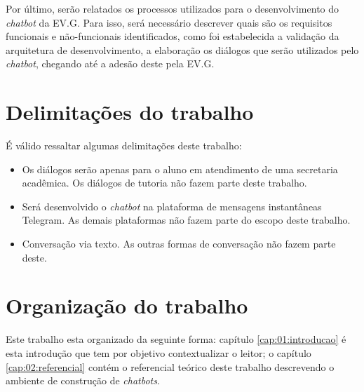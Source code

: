 Por último, serão relatados os processos utilizados para o desenvolvimento do \textit{chatbot} da EV.G. Para isso, será necessário descrever quais são os requisitos funcionais e não-funcionais identificados, como foi estabelecida a validação da arquitetura de desenvolvimento, a elaboração os diálogos que serão utilizados pelo \textit{chatbot}, chegando até a adesão deste pela EV.G.


\section{Delimitações do trabalho}\label{cap:01:sec:03:delimitacao}

É válido ressaltar algumas delimitações deste trabalho:

\begin{itemize}
    \item Os diálogos serão apenas para o aluno em atendimento de uma secretaria acadêmica. Os diálogos de tutoria não fazem parte deste trabalho.
    \item Será desenvolvido o \textit{chatbot} na plataforma de mensagens instantâneas Telegram. As demais plataformas não fazem parte do escopo deste trabalho.
    \item Conversação via texto. As outras formas de conversação não fazem parte deste.
\end{itemize}


\section{Organização do trabalho}

Este trabalho esta organizado da seguinte forma: capítulo \ref{cap:01:introducao} é esta introdução que tem por objetivo contextualizar o leitor; o capítulo \ref{cap:02:referencial} contém o referencial teórico deste trabalho descrevendo o ambiente de construção de \textit{chatbots}.
